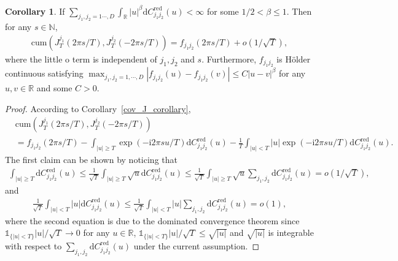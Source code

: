 \documentclass[11pt]{article}
\numberwithin{equation}{section}
\theoremstyle{plain}
\theoremstyle{definition}
\theoremstyle{definition}
\theoremstyle{assumption}
\theoremstyle{proposition}
\theoremstyle{proposition}
\newtheorem{corollary}{Corollary}[section]
\theoremstyle{example}
\theoremstyle{lemma}
\theoremstyle{theorem}
\theoremstyle{remark}
\begin{document}
\begin{corollary}\label{cov_J_corollary2}
If $\sum_{j_1,j_2=1\cdots,D}\int_{\mathbb{R}}|u|^{\beta}\mathrm{d}C_{j_1j_2}^{\mathrm{red}}(u)<\infty$ for some $1/2<\beta\leqslant1$. Then for any $s\in\mathbb{N}$,
\begin{align*}
\mathrm{cum}(J_T^{j_1}(2\pi s/T), J_T^{j_2}(-2\pi s/T))
=f_{j_1 j_2}(2\pi s/T) + o(1/\sqrt{T}),
\end{align*} 
where the little o term is independent of $j_1,j_2$ and $s$. Furthermore, $f_{j_1 j_2}$ is H{\"o}lder continuous satisfying $\max_{j_1, j_2=1,\cdots,D}|f_{j_1 j_2}(u) - f_{j_1 j_2}(v)|\leqslant C|u-v|^{\beta}$ for any $u,v\in\mathbb{R}$ and some $C>0$.

\begin{proof}
According to Corollary~\ref{cov_J_corollary},
\begin{align*}
&\mathrm{cum}(J_T^{j_1}(2\pi s/T), J_T^{j_2}(-2\pi s/T)) \\
&=f_{j_1 j_2}(2\pi s/T) - \int_{|u|\geqslant T} \exp(-\mathrm{i}2\pi s u/T)\mathrm{d}C_{j_1j_2}^{\mathrm{red}}(u) - \frac{1}{T}\int_{|u|<T} |u| \exp(-\mathrm{i}2\pi s u/T)\mathrm{d}C_{j_1j_2}^{\mathrm{red}}(u) .
\end{align*} 
The first claim can be shown by noticing that
\begin{align*}
\int_{|u|\geqslant T} \mathrm{d}C_{j_1j_2}^{\mathrm{red}}(u) 
\leqslant \frac{1}{\sqrt{T}}\int_{|u|\geqslant T} \sqrt{u} \mathrm{d}C_{j_1j_2}^{\mathrm{red}}(u) 
\leqslant \frac{1}{\sqrt{T}}\int_{|u|\geqslant T} \sqrt{u} \sum_{j_1,j_2}\mathrm{d}C_{j_1j_2}^{\mathrm{red}}(u) 
= o(1/\sqrt{T}) ,
\end{align*}
and
\begin{align*}
\frac{1}{\sqrt{T}}\int_{|u|< T} |u| \mathrm{d}C_{j_1j_2}^{\mathrm{red}}(u) 
\leqslant \frac{1}{\sqrt{T}}\int_{|u|< T} |u| \sum_{j_1,j_2}\mathrm{d}C_{j_1j_2}^{\mathrm{red}}(u)
= o(1) ,
\end{align*}
where the second equation is due to the dominated convergence theorem since $\mathds{1}_{\{|u|< T\}}|u|/\sqrt{T} \rightarrow 0$ for any $u\in\mathbb{R}$, $\mathds{1}_{\{|u|< T\}}|u|/\sqrt{T} \leqslant \sqrt{|u|}$ and $\sqrt{|u|}$ is integrable with respect to $\sum_{j_1,j_2}\mathrm{d}C_{j_1j_2}^{\mathrm{red}}(u)$ under the current assumption.


\end{proof}
\end{corollary}
\end{document}
